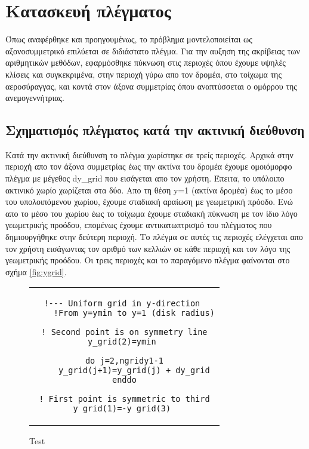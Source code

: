 \section{Κατασκευή πλέγματος}

Όπως αναφέρθηκε και προηγουμένως, το πρόβλημα μοντελοποιείται ως αξονοσυμμετρικό επιλύεται σε διδιάστατο πλέγμα. Για την αυξηση της ακρίβειας των αριθμητικών μεθόδων, εφαρμόσθηκε πύκνωση στις περιοχές όπου έχουμε υψηλές κλίσεις και συγκεκριμένα, στην περιοχή γύρω απο τον δρομέα, στο τοίχωμα της αεροσύραγγας, και κοντά στον άξονα συμμετρίας όπου αναπτύσσεται ο ομόρρου της ανεμογεννήτριας. 

\subsection{Σχηματισμός πλέγματος κατά την ακτινική διεύθυνση}

Κατά την ακτινική διεύθυνση το πλέγμα χωρίστηκε σε τρείς περιοχές. Αρχικά στην περιοχή απο τον άξονα συμμετρίας έως την ακτίνα του δρομέα έχουμε ομοιόμορφο πλέγμα με μέγεθος {dy\_grid} που εισάγεται απο τον χρήστη. Έπειτα, το υπόλοιπο ακτινικό χωρίο χωρίζεται στα δύο. Απο τη θέση y=1 (ακτίνα δρομέα) έως το μέσο του υπολοιπόμενου χωρίου, έχουμε σταδιακή αραίωση με γεωμετρική πρόοδο. Ενώ απο το μέσο του χωρίου έως το τοίχωμα έχουμε σταδιακή πύκνωση με τον ίδιο λόγο γεωμετρικής προόδου, επομένως έχουμε αντικατωπτρισμό του πλέγματος που δημιουργήθηκε στην δεύτερη περιοχή. Το πλέγμα σε αυτές τις περιοχές ελέγχεται απο τον χρήστη εισάγωντας τον αριθμό των κελλιών σε κάθε περιοχή και τον λόγο της γεωμετρικής προόδου. Οι τρεις περιοχές και το παραγόμενο πλέγμα φαίνονται στο σχήμα \ref{fig:ygrid}.

\newpage
\begin{figure}[thp]
\centering
\begin{tabular}{c}
    \begin{lstlisting}[label={lst:code}, mathescape=true, breaklines=true, linewidth=.6\textwidth]
!--- Uniform grid in y-direction 
    !From y=ymin to y=1 (disk radius)

! Second point is on symmetry line
y_grid(2)=ymin 

do j=2,ngridy1-1
    y_grid(j+1)=y_grid(j) + dy_grid
enddo

! First point is symmetric to third
y_grid(1)=-y_grid(3) 

    \end{lstlisting}
\end{tabular}
\caption*{Test}
\end{figure}
